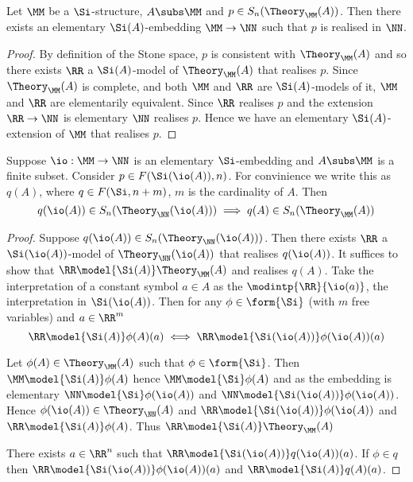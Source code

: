 \begin{lem}
    Let $\MM$ be a $\Si$-structure, 
    $A \subs \MM$ and $p \in S_n(\Theory_\MM(A))$.
    Then there exists an elementary $\Si(A)$-embedding $\MM \to \NN$ such that 
    $p$ is realised in $\NN$.
\end{lem}
\begin{proof}
    By definition of the Stone space, 
    $p$ is consistent with $\Theory_\MM(A)$ and so there exists $\RR$
    a $\Si(A)$-model of $\Theory_\MM(A)$ that realises $p$.
    Since $\Theory_\MM(A)$ is complete, 
    and both $\MM$ and $\RR$ are $\Si(A)$-models of it,
    $\MM$ and $\RR$ are elementarily equivalent.
    Since $\RR$ realises $p$ and the extension $\RR \to \NN$ is elementary 
    $\NN$ realises $p$.
    Hence we have an elementary $\Si(A)$-extension of $\MM$ that realises $p$.
\end{proof}

\begin{lem}
    Suppose $\io : \MM \to \NN$ is an elementary $\Si$-embedding
    and $A \subs \MM$ is a finite subset.
    Consider $p \in F(\Si(\io(A)),n)$.
    For convinience we write this as $q(A)$, 
    where $q \in F(\Si, n + m)$,
    $m$ is the cardinality of $A$.
    Then 
    \[q(\io(A)) \in S_n(\Theory_{\NN}(\io(A)))
    \implies q(A) \in S_n(\Theory_{\MM}(A))\]
\end{lem}
\begin{proof}
    Suppose $q(\io(A)) \in S_n(\Theory_{\NN}(\io(A)))$.
    Then there exists $\RR$ a $\Si(\io(A))$-model of $\Theory_\NN(\io(A))$ 
    that realises $q(\io(A))$. 
    It suffices to show that $\RR \model{\Si(A)} \Theory_\MM(A)$ and 
    realises $q(A)$.
    Take the interpretation of a constant symbol $a \in A$ as the 
    $\modintp{\RR}{\io(a)}$, 
    the interpretation in $\Si(\io(A))$.
    Then for any $\phi \in \form{\Si}$ (with $m$ free variables) 
    and $a \in \RR^m$
    \[\RR \model{\Si(A)} \phi(A)(a) \iff 
    \RR \model{\Si(\io(A))} \phi(\io(A))(a)\]

    Let $\phi(A) \in \Theory_\MM(A)$ such that $\phi \in \form{\Si}$.
    Then $\MM \model{\Si(A)} \phi(A)$ hence $\MM \model{\Si} \phi(A)$
    and as the embedding is elementary $\NN \model{\Si} \phi(\io(A))$
    and $\NN \model{\Si(\io(A))} \phi(\io(A))$.
    Hence $\phi(\io(A)) \in \Theory_\NN(A)$ and 
    $\RR \model{\Si(\io(A))} \phi(\io(A))$ and 
    $\RR \model{\Si(A)} \phi(A)$.
    Thus $\RR \model{\Si(A)} \Theory_\MM(A)$
    
    There exists $a \in \RR^n$ such that $\RR \model{\Si(\io(A))} q(\io(A))(a)$.
    If $\phi \in q$ then $\RR \model{\Si(\io(A))} \phi(\io(A))(a)$
    and $\RR \model{\Si(A)} q(A)(a)$.
\end{proof}

